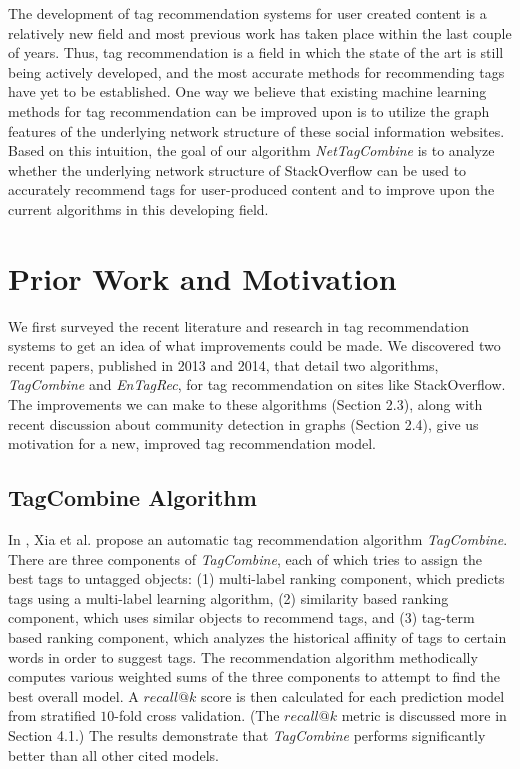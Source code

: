 \documentclass[10pt]{IEEEtran}
\begin{document}
The development of tag recommendation systems for user created content is a relatively new field and most previous work has taken place within the last couple of years. Thus, tag recommendation is a field in which the state of the art is still being actively developed, and the most accurate methods for recommending tags have yet to be established. One way we believe that existing machine learning methods for tag recommendation can be improved upon is to utilize the graph features of the underlying network structure of these social information websites. Based on this intuition, the goal of our algorithm \textit{NetTagCombine} is to analyze whether the underlying network structure of StackOverflow can be used to accurately recommend tags for user-produced content and to improve upon the current algorithms in this developing field.

\section{Prior Work and Motivation}

We first surveyed the recent literature and research in tag recommendation systems to get an idea of what improvements could be made. We discovered two recent papers, published in 2013 and 2014, that detail two algorithms, \textit{TagCombine} and \textit{EnTagRec}, for tag recommendation on sites like StackOverflow. The improvements we can make to these algorithms (Section 2.3), along with recent discussion about community detection in graphs (Section 2.4), give us motivation for a new, improved tag recommendation model.

\subsection{TagCombine Algorithm}

In \cite{1}, Xia et al. propose an automatic tag recommendation algorithm \textit{TagCombine}. There are three components of \textit{TagCombine}, each of which tries to assign the best tags to untagged objects: (1) multi-label ranking component, which predicts tags using a multi-label learning algorithm, (2) similarity based ranking component, which uses similar objects to recommend tags, and (3) tag-term based ranking component, which analyzes the historical affinity of tags to certain words in order to suggest tags. The recommendation algorithm methodically computes various weighted sums of the three components to attempt to find the best overall model. A $recall@k$ score is then calculated for each prediction model from stratified $10$-fold cross validation. (The $recall@k$ metric is discussed more in Section 4.1.) The results demonstrate that \textit{TagCombine} performs significantly better than all other cited models.
\end{document}

